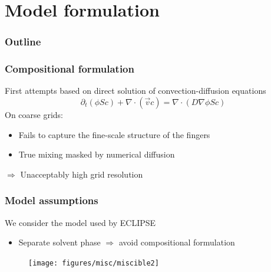 \documentclass[screen, aspectratio=43]{beamer}
\begin{document}
\section{Model formulation}

\begin{frame}
  \frametitle{Outline}
  \tableofcontents[currentsection]
\end{frame}

\begin{frame}
  \frametitle{Compositional formulation}
  First attempts based on direct solution of convection-diffusion equations
  \begin{equation*}
    \partial_t (\phi S c) + \nabla \cdot (\vec v c)  = \nabla \cdot (D\nabla \phi S c )
  \end{equation*}
  On coarse grids:
  \begin{itemize}
  \item Fails to capture the fine-scale structure of the fingers
  \item True mixing masked by numerical diffusion
  \end{itemize}
  $\Rightarrow$ Unacceptably high grid resolution
\end{frame}

\begin{frame}
  \frametitle{Model assumptions}
  \vspace{1cm}
  We consider the model used by ECLIPSE \cite{geoquest2002eclipse}
  \begin{itemize}
  \item Separate solvent phase $\Rightarrow$ avoid compositional formulation
  \end{itemize}
  \begin{figure}[h]
    \centering
    \texttt{[image: figures/misc/miscible2]}
  \end{figure}
  
\end{frame}
\end{document}
